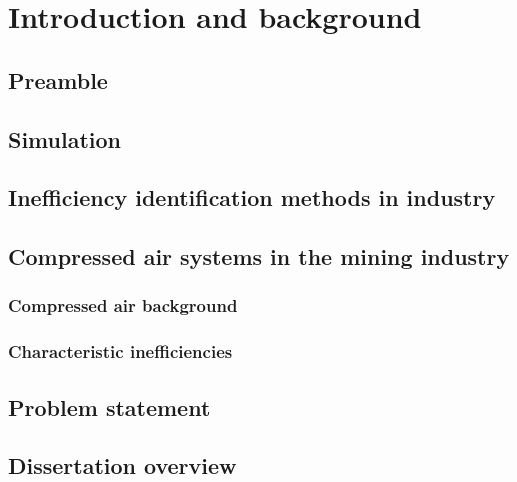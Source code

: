 \chapter{Introduction and background}
\setcounter{page}{1}
\section{Preamble}
\section{Simulation}
\section{Inefficiency identification methods in industry}
\section{Compressed air systems in the mining industry}
\subsection{Compressed air background}
\subsection{Characteristic inefficiencies}
\section{Problem statement}
\section{Dissertation overview}